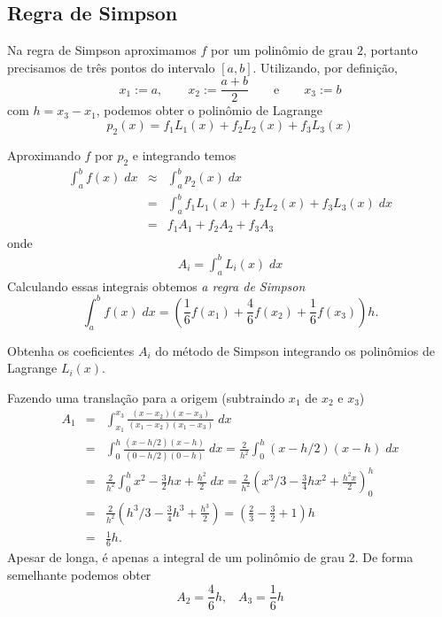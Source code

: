 \subsection{Regra de Simpson}
Na regra de Simpson aproximamos $f$ por um polinômio de grau $2$, portanto precisamos de três pontos do intervalo $[a,b]$. Utilizando, por definição,
$$
x_1:=a,\qquad x_2:=\frac{a+b}{2}\qquad \text{e}\qquad x_3:=b
$$
com $h=x_3-x_1$, podemos obter o polinômio de Lagrange
\begin{equation*}
    p_2(x) = f_1L_1(x) + f_2L_2(x)  + f_3L_3(x)
\end{equation*}

Aproximando $f$ por $p_2$ e integrando temos
\begin{eqnarray}
\int_a^bf(x)\;dx &\approx&\int_a^b p_2(x) \;dx \\
               &=&\int_a^b f_1L_1(x) + f_2L_2(x)  + f_3L_3(x) \;dx \\
               &=&f_1 A_1 + f_2A_2  + f_3A_3
\end{eqnarray}
onde
\begin{eqnarray}
  A_i = \int_a^b L_i(x) \;dx
\end{eqnarray}
Calculando essas integrais obtemos \emph{a regra de Simpson}
$$
\int_a^bf(x)\;dx=\left(\frac{1}{6}f(x_1)+\frac{4}{6}f(x_2)+\frac{1}{6}f(x_3)\right)h.
$$

\begin{ex}
Obtenha os coeficientes $A_i$ do método de Simpson  integrando os polinômios de Lagrange $L_i(x)$.

Fazendo uma translação para a origem (subtraindo $x_1$ de $x_2$ e $x_3$)
\begin{eqnarray*}
   A_1 &=& \int_{x_1}^{x_3} \frac{(x-x_2)(x-x_3)}{(x_1-x_2)(x_1-x_3)}\;dx \\
       &=& \int_0^h \frac{(x-h/2)(x-h)}{(0-h/2)(0-h)}\;dx
        =  \frac{2}{h^2} \int_0^h (x-h/2)(x-h)\;dx \\
       &=& \frac{2}{h^2} \int_0^h x^2 -\frac{3}{2}hx+\frac{h^2}{2}\;dx
        =  \frac{2}{h^2} (x^3/3 -\frac{3}{4}hx^2+\frac{h^2x}{2})_0^h \\
       &=& \frac{2}{h^2} (h^3/3 -\frac{3}{4}h^3+\frac{h^3}{2})
        =  (\frac{2}{3}-\frac{3}{2}+1)h\\
       &=& \frac{1}{6}h.
\end{eqnarray*}
Apesar de longa, é apenas a integral de um polinômio de grau 2. De forma semelhante podemos obter
$$
A_2 = \frac{4}{6}h, \;\;\; A_3 = \frac{1}{6}h
$$
\end{ex}



